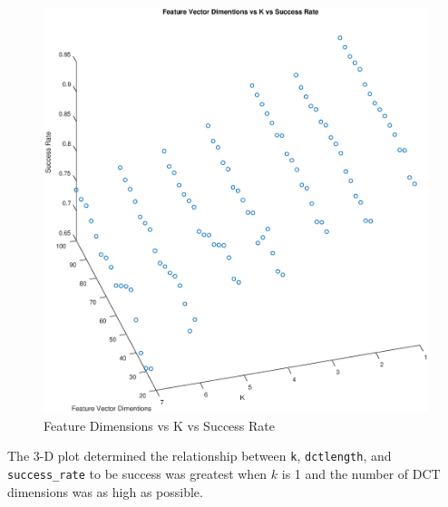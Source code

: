 \documentclass[conference]{IEEEtran}
\begin{document}
  \begin{figure}[H]
      \centering
      \includegraphics[scale=0.3]{./img/part_4_3d_plot.eps}
      \caption{Feature Dimensions vs K vs Success Rate}
      \label{fig:part_4_3d_plot}
  \end{figure}

  The 3-D plot determined the relationship between \texttt{k},
  \texttt{dctlength}, and \texttt{success\_rate} to be success was greatest when
  $k$ is 1 and the number of DCT dimensions was as high as possible.
\end{document}
